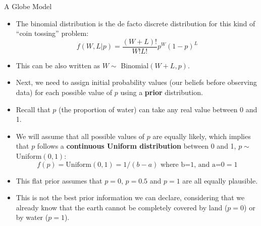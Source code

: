 \documentclass[handout]{beamer}
\begin{document}
\begin{frame}{A Globe Model}
\scriptsize{

\begin{itemize}
\item The binomial distribution is the de facto discrete distribution for this kind of ``coin tossing'' problem:
\begin{displaymath}
 f(W,L|p) = \frac{(W+L)!}{W!L!}p^W(1-p)^L
\end{displaymath}

\item This can be also written as $W\sim$ Binomial$(W+L,p)$.

\item Next, we need to assign initial probability values (our beliefs before observing data) for each possible value of $p$ using a \textbf{prior} distribution.
\item Recall that $p$ (the proportion of water) can take any real value between 0 and 1.
\item We will assume that all possible values of $p$ are equally likely, which implies that $p$ follows a \textbf{continuous Uniform distribution} between 0 and 1, $p\sim$Uniform$(0,1)$:
\begin{displaymath}
 f(p) = \text{Uniform}(0,1) = 1/(b-a) \text{ where b=1, and a=0} = 1
\end{displaymath}

\item This flat prior assumes that $p=0$, $p=0.5$ and $p=1$ are all equally plausible.
\item This is not the best prior information we can declare, considering that we already know that the earth cannot be completely covered by land ($p=0$) or by water ($p=1$).

\end{itemize}

} 


\end{frame}
\end{document}
